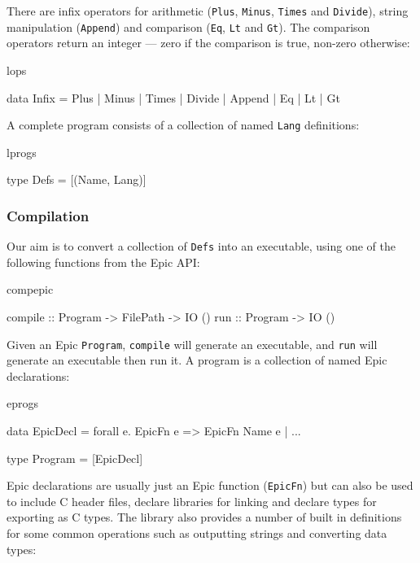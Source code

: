 \noindent
There are infix operators for arithmetic (\texttt{Plus},
\texttt{Minus}, \texttt{Times} and \texttt{Divide}), string
manipulation (\texttt{Append}) and comparison (\texttt{Eq},
\texttt{Lt} and \texttt{Gt}). The comparison operators return an
integer --- zero if the comparison is true, non-zero otherwise:

\begin{SaveVerbatim}{lops}

data Infix = Plus | Minus | Times | Divide | Append
           | Eq   | Lt    | Gt

\end{SaveVerbatim}

\noindent
A complete program consists of a collection of named \texttt{Lang}
definitions:

\begin{SaveVerbatim}{lprogs}

type Defs = [(Name, Lang)]

\end{SaveVerbatim}

\subsubsection{Compilation}

Our aim is to convert a collection of \texttt{Defs} into an
executable, using one of the following functions from the Epic API:

\begin{SaveVerbatim}{compepic}

compile :: Program -> FilePath -> IO ()
run     :: Program -> IO ()

\end{SaveVerbatim}

\noindent
Given an Epic \texttt{Program}, \texttt{compile} will generate an
executable, and \texttt{run} will generate an executable then run it.
A program is a collection of named Epic declarations:

\begin{SaveVerbatim}{eprogs}

data EpicDecl = forall e. EpicFn e => EpicFn Name e
              | ...

type Program = [EpicDecl]

\end{SaveVerbatim}

\noindent
Epic declarations are usually just an Epic function (\texttt{EpicFn})
but can also be used to include C header files, declare libraries for
linking and declare types for exporting as C types. The library also
provides a number of built in definitions for some common operations
such as outputting strings and converting data types:

